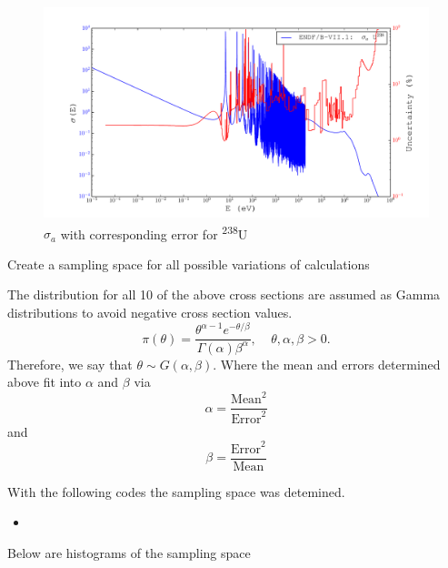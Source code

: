 \documentclass[11pt,notitlepage]{article}
\newcommand{\tss}{\textsuperscript}
\newcommand{\pythonscript}[2]{
\begin{itemize}
\item[]
\end{itemize}
}
\newcommand{\cmark}{\ding{51}}%
\newcommand{\done}{\rlap{$\square$}{\raisebox{2pt}{\large\hspace{1pt}\cmark}}%
  \hspace{-2.5pt}}
\begin{document}
\begin{todolist}
  \begin{figure}[H]
    \begin{center}
      \includegraphics[width=0.77\columnwidth]{../Weighting/X_Sections/XwVar_U_238_92_a.pdf}
      \vspace{-5mm}
      \caption{$\sigma_a$ with corresponding error for \tss{238}U}
      \label{fig:XU238}
    \end{center}
  \end{figure}
  





  
    
\item[\done]{Create a sampling space for all possible variations of
  calculations}

  The distribution for all 10 of the above cross sections are
  assumed as Gamma distributions to avoid negative cross section
  values.
  \begin{equation*}
    \pi(\theta)=\frac{\theta^{\alpha-1}e^{-\theta/\beta}}{\Gamma(\alpha)
      \beta^{\alpha}},\ \ \ \ \ \theta,\alpha,\beta>0.
  \end{equation*}
  Therefore, we say that $\theta\sim G(\alpha,\beta)$. Where the mean
  and errors determined above fit into $\alpha$ and $\beta$ via
  \begin{equation*}
    \alpha=\frac{\text{Mean}^2}{\text{Error}^2}
  \end{equation*}
  and
  \begin{equation*}
    \beta=\frac{\text{Error}^2}{\text{Mean}}
  \end{equation*}
  
  
  With the following codes the sampling space was detemined.

  
  \pythonscript{../Origen2/Sample_Gen}{Sample Generation code}


  Below are histograms of the sampling space
  

\end{todolist}
\end{document}
